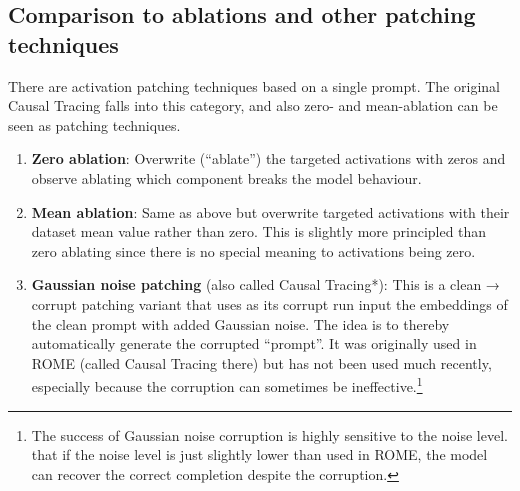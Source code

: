 \documentclass[nonatbib]{article}
\begin{document}
\subsection{Comparison to ablations and other patching techniques}
There are activation patching techniques based on a single prompt. The original Causal Tracing \citep[ROME,][]{ROME} falls into this category, and also zero- and mean-ablation can be seen as patching techniques.
\begin{enumerate}
    \item \textbf{Zero ablation}: Overwrite (“ablate”) the targeted activations with zeros and observe ablating which component breaks the model behaviour.
    \item \textbf{Mean ablation}: Same as above but overwrite targeted activations with their dataset mean value rather than zero. This is slightly more principled than zero ablating since there is no special meaning to activations being zero.
    \item \textbf{Gaussian noise patching} (also called Causal Tracing*): This is a clean → corrupt patching variant that uses as its corrupt run input the embeddings of the clean prompt with added Gaussian noise. The idea is to thereby automatically generate the corrupted “prompt”. It was originally used in ROME (called Causal Tracing there) but has not been used much recently, especially because the corruption can sometimes be ineffective.\footnote{The success of Gaussian noise corruption is highly sensitive to the noise level. \citet{Zhang2023} that if the noise level is just slightly lower than used in ROME, the model can recover the correct completion despite the corruption.}
\end{enumerate}
\end{document}
